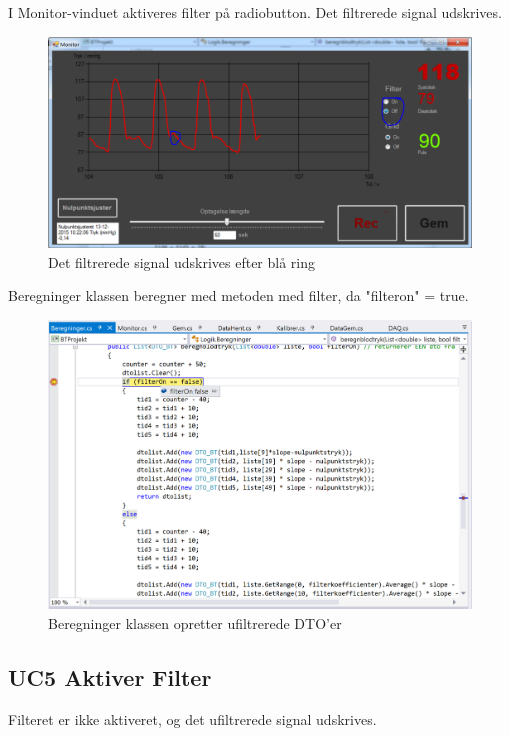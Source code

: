 I Monitor-vinduet aktiveres filter på radiobutton. Det filtrerede signal udskrives. 

\begin{figure}[H]
	\centering
	\includegraphics[width=1\textwidth]{Figurer/Test_Deaktiver_3}
	\caption{Det filtrerede signal udskrives efter blå ring}
\end{figure}

Beregninger klassen beregner med metoden med filter, da "filteron" = true.

\begin{figure}[H]
	\centering
	\includegraphics[width=1\textwidth]{Figurer/Test_Deaktiver_4}
	\caption{Beregninger klassen opretter ufiltrerede DTO'er}
\end{figure}

\subsection{UC5 Aktiver Filter}

Filteret er ikke aktiveret, og det ufiltrerede signal udskrives.


